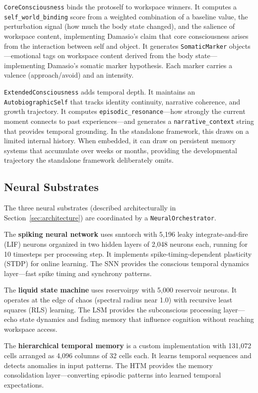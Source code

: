 \texttt{CoreConsciousness} binds the protoself to workspace winners. It computes a \texttt{self\_world\_binding} score from a weighted combination of a baseline value, the perturbation signal (how much the body state changed), and the salience of workspace content, implementing Damasio's claim that core consciousness arises from the interaction between self and object. It generates \texttt{SomaticMarker} objects---emotional tags on workspace content derived from the body state---implementing Damasio's \cite{damasio1994} somatic marker hypothesis. Each marker carries a valence (approach/avoid) and an intensity.

\texttt{ExtendedConsciousness} adds temporal depth. It maintains an \texttt{AutobiographicSelf} that tracks identity continuity, narrative coherence, and growth trajectory. It computes \texttt{episodic\_resonance}---how strongly the current moment connects to past experiences---and generates a \texttt{narrative\_context} string that provides temporal grounding. In the standalone framework, this draws on a limited internal history. When embedded, it can draw on persistent memory systems that accumulate over weeks or months, providing the developmental trajectory the standalone framework deliberately omits.

\subsection{Neural Substrates}

The three neural substrates (described architecturally in Section~\ref{sec:architecture}) are coordinated by a \texttt{NeuralOrchestrator}.

The \textbf{spiking neural network} uses snntorch \cite{eshraghian2023} with 5,196 leaky integrate-and-fire (LIF) neurons organized in two hidden layers of 2,048 neurons each, running for 10 timesteps per processing step. It implements spike-timing-dependent plasticity (STDP) for online learning. The SNN provides the conscious temporal dynamics layer---fast spike timing and synchrony patterns.

The \textbf{liquid state machine} uses reservoirpy \cite{trouvain2020} with 5,000 reservoir neurons. It operates at the edge of chaos (spectral radius near 1.0) with recursive least squares (RLS) learning. The LSM provides the subconscious processing layer---echo state dynamics and fading memory that influence cognition without reaching workspace access.

The \textbf{hierarchical temporal memory} is a custom implementation with 131,072 cells arranged as 4,096 columns of 32 cells each. It learns temporal sequences and detects anomalies in input patterns. The HTM provides the memory consolidation layer---converting episodic patterns into learned temporal expectations.

